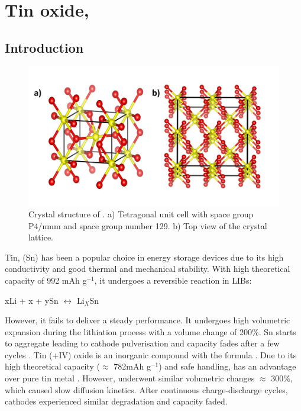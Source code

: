 \section{Tin oxide, }

\subsection{Introduction}

\begin{figure}[th!]
  \centering
  \includegraphics[width=\textwidth]{Figures/chap6fig/SnO2crys}
    \caption{Crystal structure of . a) Tetragonal unit cell with space group P4/nmm and space group number 129. b) Top view of the crystal lattice.}
  \label{Figures/chap6fig:SnO2crys}
  \end{figure}
  
Tin, (Sn) has been a popular choice in energy storage devices due to its high conductivity and good thermal and mechanical stability. With high theoretical capacity of 992 mAh g$^{-1}$, it undergoes a reversible reaction in LIBs:

\begin{center}
    xLi + x + ySn $\longleftrightarrow$ Li$_X$Sn  \cite{park_effect_2008}
\end{center}

However, it fails to deliver a steady performance. It undergoes high volumetric expansion during the lithiation process with a volume change of 200\%. Sn starts to aggregate leading to cathode pulverisation and capacity fades after a few cycles \cite{park_effect_2008, zhao_tin-based_2016}.  
Tin (+IV) oxide is an inorganic compound with the formula . Due to its high theoretical capacity ($\approx$ 782mAh g$^{-1}$) and safe handling,  has an advantage over pure tin metal \cite{idota_tin-based_1997}. However,  underwent similar volumetric changes $\approx$ 300{\%}, which caused slow diffusion kinetics. After continuous charge-discharge cycles, cathodes experienced similar degradation and capacity faded.


